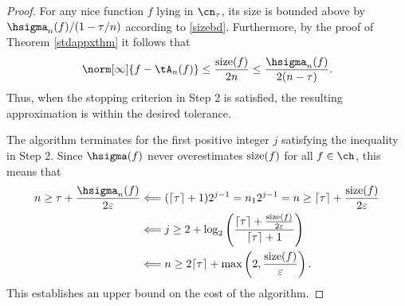 \begin{proof}  For any nice function $f$ lying in $\cn_\tau$, its size is bounded above by $\hsigma_n(f)/(1-\tau/n)$ according to \eqref{sizebd}.  Furthermore, by the proof of Theorem \ref{stdappxthm} it follows that 
\[
\norm[\infty]{f - \tA_n(f)} \le \frac{\size(f)}{2n} \le \frac{\hsigma_n(f)}{2(n-\tau)}.
\]
Thus, when the stopping criterion in Step 2 is satisfied, the resulting approximation is within the desired tolerance.

The algorithm terminates for the first positive integer $j$ satisfying the inequality in Step 2.  Since $\hsigma(f)$ never overestimates $\operatorname{size}(f)$ for all $f \in \ch$, this means that
\begin{align*}
n \ge \tau + \frac{\hsigma_n(f)}{2 \varepsilon} 
& \Longleftarrow (\lceil \tau \rceil + 1 ) 2^{j-1} = n_1 2^{j-1} = n \ge \lceil \tau \rceil + \frac{\size(f)}{2 \varepsilon} \\
& \Longleftarrow j \ge 2 +  \log_2\left(\frac{\lceil \tau \rceil + \frac{\size(f)}{2 \varepsilon}} {\lceil \tau \rceil + 1} \right) \\
& \Longleftarrow n \ge 2 \lceil \tau \rceil + \max\left(2,\frac{\size(f)}{\varepsilon} \right).
\end{align*}
This establishes an upper bound on the cost of the algorithm.


\end{proof}
